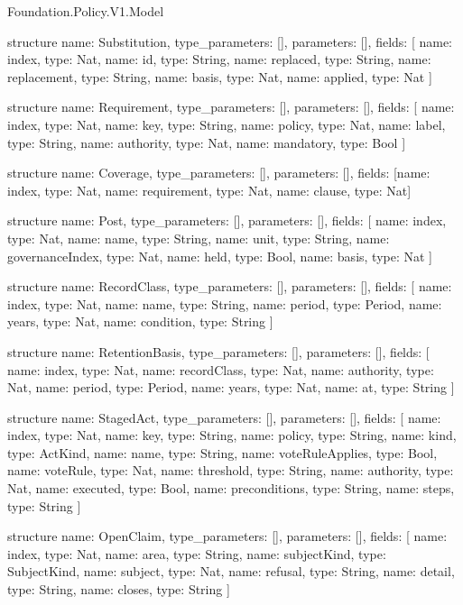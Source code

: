 \begin{lexlean}{Foundation.Policy.V1.Model}
\begin{semanticmodule}
structure{
  name: Substitution,
  type_parameters: [],
  parameters: [],
  fields: [
    {name: index, type: Nat},
    {name: id, type: String},
    {name: replaced, type: String},
    {name: replacement, type: String},
    {name: basis, type: Nat},
    {name: applied, type: Nat}
  ]
}

structure{
  name: Requirement,
  type_parameters: [],
  parameters: [],
  fields: [
    {name: index, type: Nat},
    {name: key, type: String},
    {name: policy, type: Nat},
    {name: label, type: String},
    {name: authority, type: Nat},
    {name: mandatory, type: Bool}
  ]
}

structure{
  name: Coverage,
  type_parameters: [],
  parameters: [],
  fields: [{name: index, type: Nat}, {name: requirement, type: Nat}, {name: clause, type: Nat}]
}

structure{
  name: Post,
  type_parameters: [],
  parameters: [],
  fields: [
    {name: index, type: Nat},
    {name: name, type: String},
    {name: unit, type: String},
    {name: governanceIndex, type: Nat},
    {name: held, type: Bool},
    {name: basis, type: Nat}
  ]
}

structure{
  name: RecordClass,
  type_parameters: [],
  parameters: [],
  fields: [
    {name: index, type: Nat},
    {name: name, type: String},
    {name: period, type: Period},
    {name: years, type: Nat},
    {name: condition, type: String}
  ]
}

structure{
  name: RetentionBasis,
  type_parameters: [],
  parameters: [],
  fields: [
    {name: index, type: Nat},
    {name: recordClass, type: Nat},
    {name: authority, type: Nat},
    {name: period, type: Period},
    {name: years, type: Nat},
    {name: at, type: String}
  ]
}

structure{
  name: StagedAct,
  type_parameters: [],
  parameters: [],
  fields: [
    {name: index, type: Nat},
    {name: key, type: String},
    {name: policy, type: String},
    {name: kind, type: ActKind},
    {name: name, type: String},
    {name: voteRuleApplies, type: Bool},
    {name: voteRule, type: Nat},
    {name: threshold, type: String},
    {name: authority, type: Nat},
    {name: executed, type: Bool},
    {name: preconditions, type: String},
    {name: steps, type: String}
  ]
}

structure{
  name: OpenClaim,
  type_parameters: [],
  parameters: [],
  fields: [
    {name: index, type: Nat},
    {name: area, type: String},
    {name: subjectKind, type: SubjectKind},
    {name: subject, type: Nat},
    {name: refusal, type: String},
    {name: detail, type: String},
    {name: closes, type: String}
  ]
}


\end{semanticmodule}
\end{lexlean}
